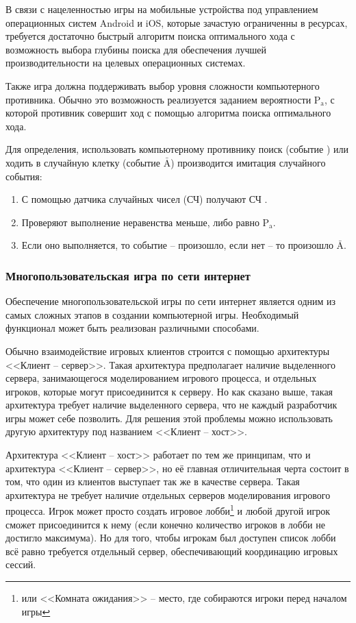 В связи с нацеленностью игры на мобильные устройства под управлением операционных систем Android и iOS, которые зачастую ограниченны в ресурсах, требуется достаточно быстрый алгоритм поиска оптимального хода с возможность выбора глубины поиска для обеспечения лучшей производительности на целевых операционных системах.

Также игра должна поддерживать выбор уровня сложности компьютерного противника. Обычно это возможность реализуется заданием вероятности $\text{P}_\text{a}$, с которой противник совершит ход с помощью алгоритма поиска оптимального хода.

Для определения, использовать компьютерному противнику поиск (событие ) или ходить в случайную клетку (событие $\bar{\text{A}}$) производится имитация случайного события:
\begin{enumerate}[label=\arabic*, itemindent=\parindent + 2.25ex]
    \item С помощью датчика случайных чисел (СЧ) получают СЧ .
    \item Проверяют выполнение неравенства  меньше, либо равно $\text{P}_\text{a}$.
    \item Если оно выполняется, то событие  -- произошло, если нет -- то произошло $\bar{\text{A}}$.
\end{enumerate}


\subsubsection{Многопользовательская игра по сети интернет}

Обеспечение многопользовательской игры по сети интернет является одним из самых сложных этапов в создании компьютерной игры. Необходимый функционал может быть реализован различными способами.

Обычно взаимодействие игровых клиентов строится с помощью архитектуры <<Клиент -- сервер>>. Такая архитектура предполагает наличие выделенного сервера, занимающегося моделированием игрового процесса, и отдельных игроков, которые могут присоединится к серверу. Но как сказано выше, такая архитектура требует наличие выделенного сервера, что не каждый разработчик игры может себе позволить. Для решения этой проблемы можно использовать другую архитектуру под названием <<Клиент -- хост>>.

Архитектура <<Клиент -- хост>> работает по тем же принципам, что и архитектура <<Клиент -- сервер>>, но её главная отличительная черта состоит в том, что один из клиентов выступает так же в качестве сервера. Такая архитектура не требует наличие отдельных серверов моделирования игрового процесса. Игрок может просто создать игровое лобби\footnote{или <<Комната ожидания>> -- место, где собираются игроки перед началом игры} и любой другой игрок сможет присоединится к нему (если конечно количество игроков в лобби не достигло максимума). Но для того, чтобы игрокам был доступен список лобби всё равно требуется отдельный сервер, обеспечивающий координацию игровых сессий.

